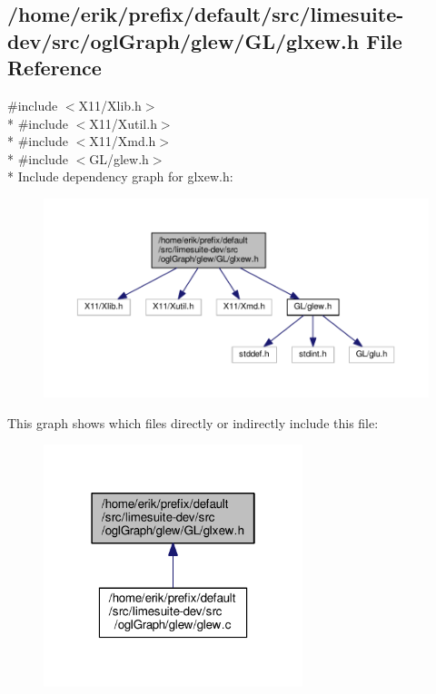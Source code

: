 \subsection{/home/erik/prefix/default/src/limesuite-\/dev/src/ogl\+Graph/glew/\+G\+L/glxew.h File Reference}
\label{glxew_8h}
{\ttfamily \#include $<$X11/\+Xlib.\+h$>$}\\*
{\ttfamily \#include $<$X11/\+Xutil.\+h$>$}\\*
{\ttfamily \#include $<$X11/\+Xmd.\+h$>$}\\*
{\ttfamily \#include $<$G\+L/glew.\+h$>$}\\*
Include dependency graph for glxew.\+h\+:
\nopagebreak
\begin{figure}[H]
\begin{center}
\leavevmode
\includegraphics[width=350pt]{d2/d8a/glxew_8h__incl}
\end{center}
\end{figure}
This graph shows which files directly or indirectly include this file\+:
\nopagebreak
\begin{figure}[H]
\begin{center}
\leavevmode
\includegraphics[width=214pt]{d6/d54/glxew_8h__dep__incl}
\end{center}
\end{figure}
